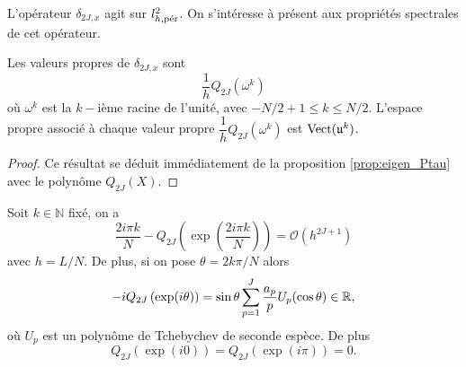 L'opérateur $\delta_{2J,x}$ agit sur $l^2_{h,\per}$. On s'intéresse à présent aux propriétés spectrales de cet opérateur.
\begin{proposition}
Les valeurs propres de $\delta_{2J,x}$ sont
\begin{equation}
\dfrac{1}{h}Q_{2J}(\omega^k)
\end{equation}
où $\omega^k$ est la $k-$ième racine de l'unité, avec $-N/2+1 \leq k \leq N/2$. L'espace propre associé à chaque valeur propre $\dfrac{1}{h}Q_{2J}(\omega^k)$ est $\Vect ( \mathfrak{u}^k )$.
\label{prop:delta_x_spectre}
\end{proposition}

\begin{proof}
Ce résultat se déduit immédiatement de la proposition \ref{prop:eigen_Ptau} avec le polynôme $Q_{2J}(X)$.
\end{proof}

\begin{proposition}
Soit $k \in \mathbb{N}$ fixé, on a 
\begin{equation}
\dfrac{2 i \pi k}{N} - Q_{2J} \left( \exp \left( \dfrac{2 i \pi k}{N} \right) \right) = \mathcal{O}(h^{2J+1})
\end{equation}
avec $h=L/N$.
De plus, si on pose $\theta= 2 k \pi / N$ alors 
\begin{equation}
-i Q_{2J} \left( \exp ( i \theta ) \right) = \sin \theta \gsum_{p=1}^J \dfrac{a_p}{p} U_p (\cos \theta)\in \mathbb{R},
\end{equation}
où $U_p$ est un polynôme de Tchebychev de seconde espèce. De plus 
\begin{equation}
Q_{2J} \left( \exp ( i 0 ) \right) = Q_{2J} \left( \exp ( i \pi ) \right) = 0.
\end{equation}
\label{prop:freq_pol_classique1}
\end{proposition}

